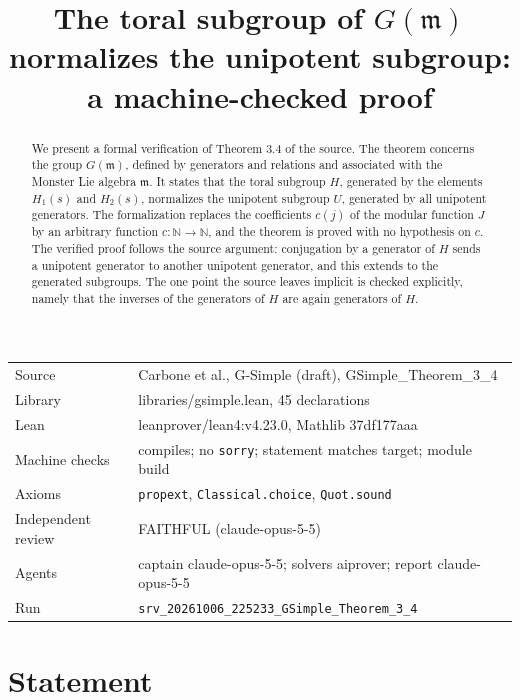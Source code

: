\documentclass[11pt]{article}
\title{The toral subgroup of $G(\mathfrak{m})$ normalizes the unipotent subgroup: a machine-checked proof}
\date{}
\theoremstyle{definition}
\theoremstyle{remark}
\begin{document}
\maketitle
\begin{abstract}
We present a formal verification of Theorem 3.4 of the source. The theorem concerns the group $G(\mathfrak{m})$, defined by generators and relations and associated with the Monster Lie algebra $\mathfrak{m}$. It states that the toral subgroup $H$, generated by the elements $H_1(s)$ and $H_2(s)$, normalizes the unipotent subgroup $U$, generated by all unipotent generators. The formalization replaces the coefficients $c(j)$ of the modular function $J$ by an arbitrary function $c\colon\mathbb{N}\to\mathbb{N}$, and the theorem is proved with no hypothesis on $c$. The verified proof follows the source argument: conjugation by a generator of $H$ sends a unipotent generator to another unipotent generator, and this extends to the generated subgroups. The one point the source leaves implicit is checked explicitly, namely that the inverses of the generators of $H$ are again generators of $H$.
\end{abstract}

\begin{center}\small
\begin{tabular}{@{}ll@{}}
\toprule
Source & Carbone et al., G-Simple (draft), GSimple\_Theorem\_3\_4 \\
Library & libraries/gsimple.lean, 45 declarations \\
Lean & leanprover/lean4:v4.23.0, Mathlib 37df177aaa \\
Machine checks & compiles; no \texttt{sorry}; statement matches target; module build \\
Axioms & \texttt{propext}, \texttt{Classical.choice}, \texttt{Quot.sound} \\
Independent review & FAITHFUL (claude-opus-5-5) \\
Agents & captain claude-opus-5-5; solvers aiprover; report claude-opus-5-5 \\
Run & \texttt{srv\_20261006\_225233\_GSimple\_Theorem\_3\_4} \\
\bottomrule
\end{tabular}
\end{center}

\tableofcontents

\section{Statement}
\end{document}

